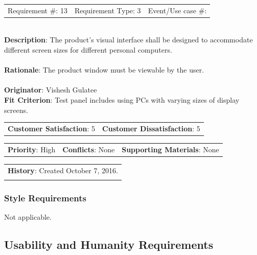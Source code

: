 \documentclass[12pt, titlepage]{article}
\begin{document}
\begin{reqbox}

\begin{tabular}{lll}
Requirement \#: 13 & Requirement Type: 3 & Event/Use case \#: \\
\end{tabular} \\

\textbf{Description}: The product's visual interface shall be designed to accommodate different screen sizes for different personal
computers. \\ \\
\textbf{Rationale}: The product window must be viewable by the user. \\ \\
\textbf{Originator}: Vishesh Gulatee \\
\textbf{Fit Criterion}: Test panel includes using PCs with varying sizes of display screens. \\

\begin{tabular}{ll}
\textbf{Customer Satisfaction}: 5 & \textbf{Customer Dissatisfaction}: 5 \\
\end{tabular}

\begin{tabular}{lll}
\textbf{Priority}: High & \textbf{Conflicts}: None & \textbf{Supporting Materials}: None \\
\end{tabular}

\begin{tabular}{l}
\textbf{History}: Created October 7, 2016.\\ \\
\end{tabular}

\end{reqbox}
\subsubsection{Style Requirements}
Not applicable.
\subsection{Usability and Humanity Requirements}
\end{document}
